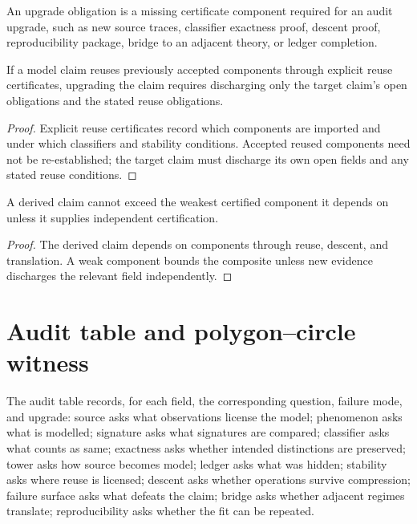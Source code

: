 \begin{definition}
\label{def:upgrade-obligation}
An upgrade obligation is a missing certificate component required for an audit upgrade, such as new source traces, classifier exactness proof, descent proof, reproducibility package, bridge to an adjacent theory, or ledger completion.
\end{definition}

\begin{theorem}
\label{thm:audit-upgrades-local-explicit-reuse}
If a model claim reuses previously accepted components through explicit reuse certificates, upgrading the claim requires discharging only the target claim's open obligations and the stated reuse obligations.
\end{theorem}

\begin{proof}
Explicit reuse certificates record which components are imported and under which classifiers and stability conditions. Accepted reused components need not be re-established; the target claim must discharge its own open fields and any stated reuse conditions.
\end{proof}

\begin{corollary}
\label{cor:composite-strength-weakest-dependency}
A derived claim cannot exceed the weakest certified component it depends on unless it supplies independent certification.
\end{corollary}

\begin{proof}
The derived claim depends on components through reuse, descent, and translation. A weak component bounds the composite unless new evidence discharges the relevant field independently.
\end{proof}

\section{Audit table and polygon--circle witness}
\label{sec:audit-table-polygon-circle}

\begin{definition}
\label{def:audit-table}
The audit table records, for each field, the corresponding question, failure mode, and upgrade: source asks what observations license the model; phenomenon asks what is modelled; signature asks what signatures are compared; classifier asks what counts as same; exactness asks whether intended distinctions are preserved; tower asks how source becomes model; ledger asks what was hidden; stability asks where reuse is licensed; descent asks whether operations survive compression; failure surface asks what defeats the claim; bridge asks whether adjacent regimes translate; reproducibility asks whether the fit can be repeated.
\end{definition}

